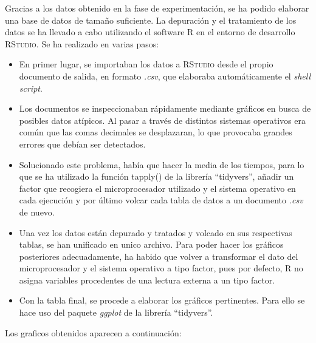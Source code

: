 \documentclass[12pt,a4paper]{article}
\begin{document}
Gracias a los datos obtenido en la fase de experimentación, se ha podido elaborar una base de datos de tamaño suficiente. La depuración y el tratamiento de los datos se ha llevado a cabo utilizando el software \textsc{R} en el entorno de desarrollo \textsc{RStudio}. Se ha realizado en varias pasos: 
\begin{itemize}
	\item En primer lugar, se importaban los datos a \textsc{RStudio} desde el propio documento de salida, en formato \textit{.csv}, que elaboraba automáticamente el \textit{shell script}. 
	\item Los documentos se inspeccionaban rápidamente mediante gráficos en busca de posibles datos atípicos. Al pasar a través de distintos sistemas operativos era común que las comas decimales se desplazaran, lo que provocaba grandes errores que debían ser detectados.
	\item Solucionado este problema, había que hacer la media de los tiempos, para lo que se ha utilizado la función \textsf{tapply()} de la librería ``tidyvers'', añadir un factor que recogiera el microprocesador utilizado y el sistema operativo en cada ejecución y por último volcar cada tabla de datos a un documento \textit{.csv} de nuevo.
	\item Una vez los datos están depurado y tratados y volcado en sus respectivas tablas, se han unificado en unico archivo. Para poder hacer los gráficos posteriores adecuadamente, ha habido que volver a transformar el dato del microprocesador y el sistema operativo a tipo factor, pues por defecto, \textsc{R} no asigna variables procedentes de una lectura externa a un tipo factor. 
	\item Con la tabla final, se procede a elaborar los gráficos pertinentes. Para ello se hace uso del paquete \textit{ggplot} de la librería ``tidyvers''.
\end{itemize}
 
Los graficos obtenidos aparecen a continuación: 
\end{document}
